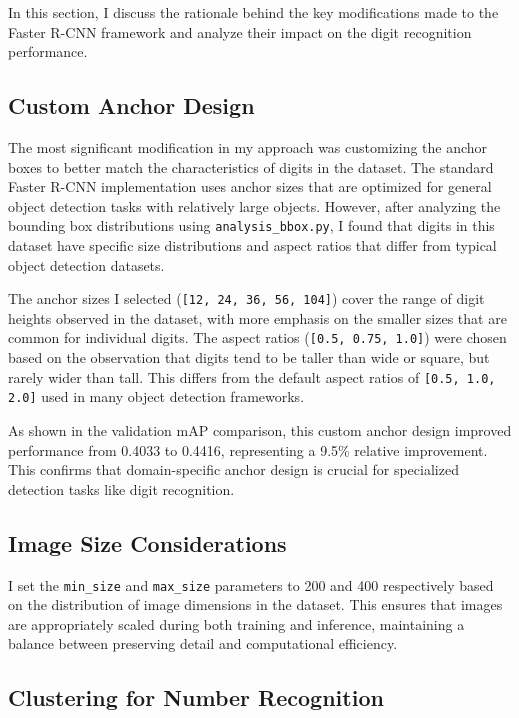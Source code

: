 \documentclass[twocolumn,a4paper]{article}
\begin{document}
In this section, I discuss the rationale behind the key modifications made to the Faster R-CNN framework and analyze their impact on the digit recognition performance.

\subsection{Custom Anchor Design}

The most significant modification in my approach was customizing the anchor boxes to better match the characteristics of digits in the dataset. The standard Faster R-CNN implementation uses anchor sizes that are optimized for general object detection tasks with relatively large objects. However, after analyzing the bounding box distributions using \texttt{analysis\_bbox.py}, I found that digits in this dataset have specific size distributions and aspect ratios that differ from typical object detection datasets.

The anchor sizes I selected (\texttt{[12, 24, 36, 56, 104]}) cover the range of digit heights observed in the dataset, with more emphasis on the smaller sizes that are common for individual digits. The aspect ratios (\texttt{[0.5, 0.75, 1.0]}) were chosen based on the observation that digits tend to be taller than wide or square, but rarely wider than tall. This differs from the default aspect ratios of \texttt{[0.5, 1.0, 2.0]} used in many object detection frameworks.

As shown in the validation mAP comparison, this custom anchor design improved performance from 0.4033 to 0.4416, representing a 9.5\% relative improvement. This confirms that domain-specific anchor design is crucial for specialized detection tasks like digit recognition.

\subsection{Image Size Considerations}

I set the \texttt{min\_size} and \texttt{max\_size} parameters to 200 and 400 respectively based on the distribution of image dimensions in the dataset. This ensures that images are appropriately scaled during both training and inference, maintaining a balance between preserving detail and computational efficiency.

\subsection{Clustering for Number Recognition}
\end{document}
